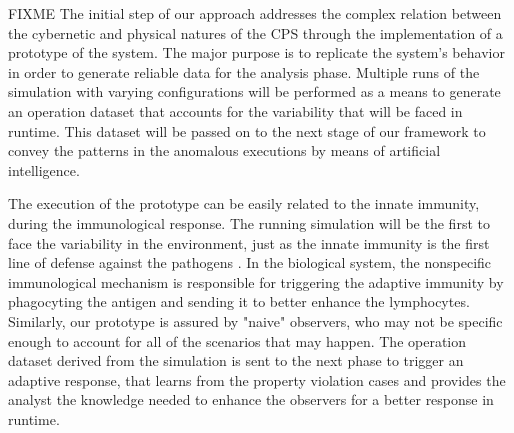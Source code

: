 

FIXME
The initial step of our approach addresses the complex relation between the cybernetic and physical natures of the CPS through the implementation of a prototype of the system.  %
The major purpose is to replicate the system's behavior in order to generate reliable data for the analysis phase. Multiple runs of the simulation with varying configurations will be performed as a means to generate an operation dataset that accounts for the variability that will be faced in runtime. This dataset will be passed on to the next stage of our framework to convey the patterns in the anomalous executions by means of artificial intelligence.

The execution of the prototype can be easily related to the innate immunity, during the immunological response. The running simulation will be the first to face the variability in the environment, just as the innate immunity is the first line of defense against the pathogens \cite{Kuby2019}. In the biological system, the nonspecific immunological mechanism is responsible for triggering the adaptive immunity by phagocyting the antigen and sending it to better enhance the lymphocytes. Similarly, our prototype is assured by "naive" observers, who may not be specific enough to account for all of the scenarios that may happen. The operation dataset derived from the simulation is sent to the next phase to trigger an adaptive response, that learns from the property violation cases and provides the analyst the knowledge needed to enhance the observers for a better response in runtime.

